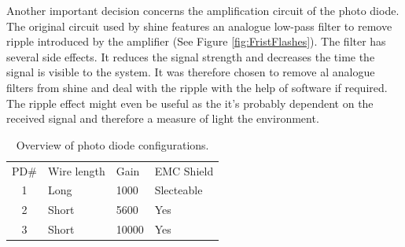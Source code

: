 Another important decision concerns the amplification circuit of the photo diode. The original circuit used by shine features an analogue low-pass filter to remove ripple introduced by the amplifier (See Figure \ref{fig:FristFlashes}). The filter has several side effects. It reduces the signal strength and decreases the time the signal is visible to the system. It was therefore chosen to remove al analogue filters from shine and deal with the ripple with the help of software if required. The ripple effect might even be useful as the it's probably dependent on the received signal and therefore a measure of light the environment.

\begin{table}[]
	\centering
	\begin{tabular}{clll}
		PD\#                   & Wire length & Gain  & EMC Shield \\ \cline{2-4} 
		\multicolumn{1}{c|}{1} & Long        & 1000  & Slecteable \\
		\multicolumn{1}{c|}{2} & Short       & 5600  & Yes        \\
		\multicolumn{1}{c|}{3} & Short       & 10000 & Yes       
	\end{tabular}
	\caption{Overview of photo diode configurations.\label{tbl:PDs}}
\end{table}

